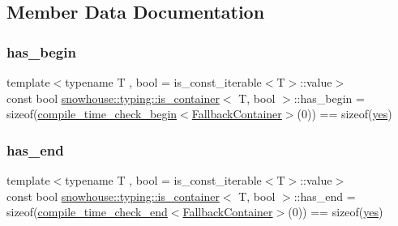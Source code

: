 \subsection{Member Data Documentation}
\mbox{\label{structsnowhouse_1_1typing_1_1is__container_a91debdf371b7a26c649f1fba5f5c3e9c}} 
\subsubsection{\texorpdfstring{has\_begin}{has\_begin}}
{\footnotesize\ttfamily template$<$typename T , bool  = is\+\_\+const\+\_\+iterable$<$\+T$>$\+::value$>$ \\
const bool \mbox{\hyperlink{structsnowhouse_1_1typing_1_1is__container}{snowhouse\+::typing\+::is\+\_\+container}}$<$ T, bool $>$\+::has\+\_\+begin = sizeof(\mbox{\hyperlink{structsnowhouse_1_1typing_1_1is__container_a99f830a0dd21b6c44c1949df6a870529}{compile\+\_\+time\+\_\+check\+\_\+begin}}$<$\mbox{\hyperlink{structsnowhouse_1_1typing_1_1is__container_1_1FallbackContainer}{Fallback\+Container}}$>$(0)) == sizeof(\mbox{\hyperlink{namespacesnowhouse_1_1typing_a4b319cb7567ee3475023c05ed2dadb16}{yes}})\hspace{0.3cm}{\ttfamily [static]}}

\mbox{\label{structsnowhouse_1_1typing_1_1is__container_a3508fcf59d54260c3287f8cb00db3ee8}} 
\subsubsection{\texorpdfstring{has\_end}{has\_end}}
{\footnotesize\ttfamily template$<$typename T , bool  = is\+\_\+const\+\_\+iterable$<$\+T$>$\+::value$>$ \\
const bool \mbox{\hyperlink{structsnowhouse_1_1typing_1_1is__container}{snowhouse\+::typing\+::is\+\_\+container}}$<$ T, bool $>$\+::has\+\_\+end = sizeof(\mbox{\hyperlink{structsnowhouse_1_1typing_1_1is__container_a32ebf1d5da5ac8a86c2048b2e00816ff}{compile\+\_\+time\+\_\+check\+\_\+end}}$<$\mbox{\hyperlink{structsnowhouse_1_1typing_1_1is__container_1_1FallbackContainer}{Fallback\+Container}}$>$(0)) == sizeof(\mbox{\hyperlink{namespacesnowhouse_1_1typing_a4b319cb7567ee3475023c05ed2dadb16}{yes}})\hspace{0.3cm}{\ttfamily [static]}}


